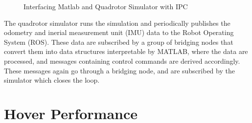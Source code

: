 \documentclass[letter, 10pt]{article}
\def\helv{\fontfamily{phv}\bfseries\selectfont}
\begin{document}
\begin{onehalfspacing}
\begin{figure}[h!]
\vspace{0pt}
	\caption{Interfacing Matlab and Quadrotor Simulator with IPC}
	\label{matlab-quadrotor-interface}
\end{figure}

The quadrotor simulator runs the simulation and periodically publishes the odometry and inerial measurement unit (IMU) data
to the Robot Operating System (ROS). These data are subscribed by a group of bridging nodes that convert them into data 
structures interpretable by MATLAB, where the data are processed, and messages containing control commands are
derived accordingly. These messages again go through a bridging node, and are subscribed by the simulator which closes the loop. 

\section{Hover Performance}


\end{onehalfspacing}
\end{document}
